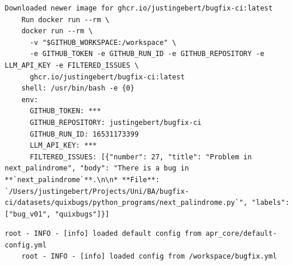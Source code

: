 \begin{lstlisting}[style=log, caption={Docker container runtime log excerpt}, label={lst:docker-log}]
    Downloaded newer image for ghcr.io/justingebert/bugfix-ci:latest
    Run docker run --rm \
    docker run --rm \
      -v "$GITHUB_WORKSPACE:/workspace" \
      -e GITHUB_TOKEN -e GITHUB_RUN_ID -e GITHUB_REPOSITORY -e LLM_API_KEY -e FILTERED_ISSUES \
      ghcr.io/justingebert/bugfix-ci:latest
    shell: /usr/bin/bash -e {0}
    env:
      GITHUB_TOKEN: ***
      GITHUB_REPOSITORY: justingebert/bugfix-ci
      GITHUB_RUN_ID: 16531173399
      LLM_API_KEY: ***
      FILTERED_ISSUES: [{"number": 27, "title": "Problem in next_palindrome", "body": "There is a bug in **`next_palindrome`**.\n\n* **File**: `/Users/justingebert/Projects/Uni/BA/bugfix-ci/datasets/quixbugs/python_programs/next_palindrome.py`", "labels": ["bug_v01", "quixbugs"]}]
\end{lstlisting}

\begin{lstlisting}[style=log, caption={Load custom configuration}, label={lst:load-config}]
    root - INFO - [info] loaded default config from apr_core/default-config.yml
    root - INFO - [info] loaded config from /workspace/bugfix.yml
\end{lstlisting}